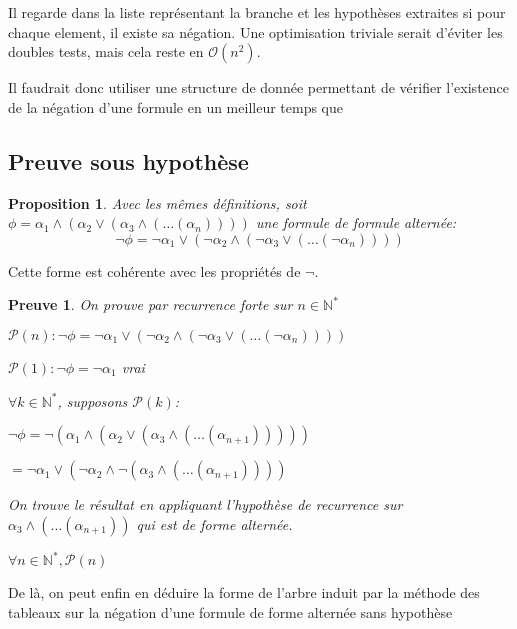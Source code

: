\documentclass{paper}
\newtheorem{prop}{Proposition}
\newtheorem{preuve}{Preuve}
\begin{document}
Il regarde dans la liste représentant la branche et les hypothèses extraites si pour chaque element, il existe sa négation. Une optimisation triviale serait d'éviter les doubles tests,
mais cela reste en $\mathcal{O}(n^2)$.

Il faudrait donc utiliser une structure de donnée permettant de vérifier l'existence de la négation d'une formule en un meilleur temps que





\subsection{Preuve sous hypothèse}

\begin{prop}
    Avec les mêmes définitions, soit $\phi = \alpha_1 \land (\alpha_2 \lor (\alpha_3 \land (\dots (\alpha_n))))$ une formule de formule alternée:
    $$\lnot\phi = \lnot\alpha_1 \lor (\lnot\alpha_2 \land (\lnot\alpha_3 \lor (\dots (\lnot\alpha_n))))$$
\end{prop}
Cette forme est cohérente avec les propriétés de $\lnot$.

\begin{preuve}
    On prouve par recurrence forte sur $n\in\mathbb{N}^*$

    $\mathcal{P}(n): \lnot\phi = \lnot\alpha_1 \lor (\lnot\alpha_2 \land (\lnot\alpha_3 \lor (\dots (\lnot\alpha_n))))$

    $\mathcal{P}(1): \lnot\phi = \lnot\alpha_1$ vrai

    $\forall k\in\mathbb{N}^*$, supposons $\mathcal{P}(k)$:

    $\lnot\phi = \lnot (\alpha_1 \land (\alpha_2 \lor (\alpha_3 \land (\dots (\alpha_{n+1})))))$

    $= \lnot\alpha_1 \lor (\lnot\alpha_2 \land \lnot(\alpha_3 \land (\dots (\alpha_{n+1}))))$

    On trouve le résultat en appliquant l'hypothèse de recurrence sur $\alpha_3 \land (\dots (\alpha_{n+1}))$ qui est de forme alternée.

    $\forall n\in\mathbb{N}^*, \mathcal{P}(n)$
\end{preuve}

De là, on peut enfin en déduire la forme de l'arbre induit par la méthode des tableaux sur la négation d'une formule de forme alternée sans hypothèse

\end{document}
